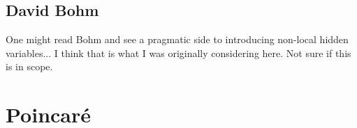 \documentclass{article}
\begin{document}
\subsection{David Bohm}

One might read Bohm and see a pragmatic side to introducing non-local hidden variables... I think that is what I was originally considering here.  Not sure if this is in scope.








\section{Poincar\'e}
\end{document}
